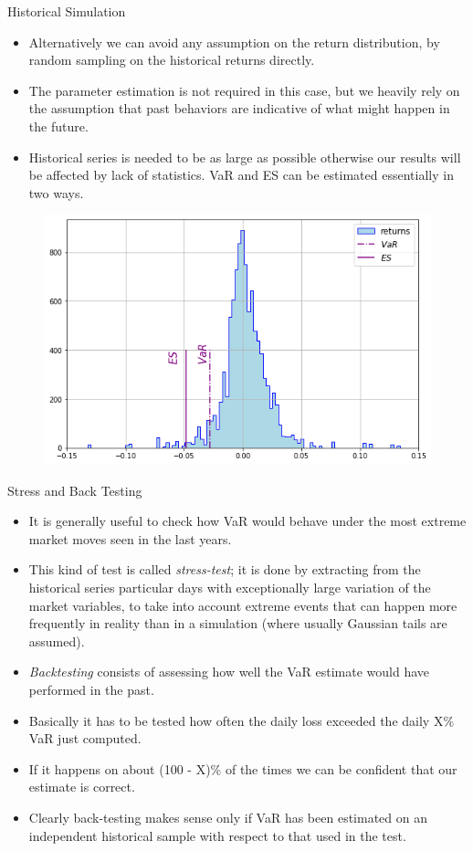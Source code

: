 \documentclass{beamer}
\begin{document}
\begin{frame}{Historical Simulation}
  \begin{itemize}
  \item Alternatively we can avoid any assumption on the return distribution, by random sampling on the historical returns directly. 
  \item The parameter estimation is not required in this case, but we heavily rely on the assumption that past behaviors are indicative of what might happen in the future. 
  \item Historical series is needed to be as large as possible otherwise our results will be affected by lack of statistics. 
    VaR and ES can be estimated essentially in two ways.
  \end{itemize}
  \begin{figure}[h]
    \begin{center}
      \includegraphics[width=0.4\linewidth]{historical_var}
    \end{center}
  \end{figure}
\end{frame}

\begin{frame}{Stress and Back Testing}
  \begin{itemize}
  \item It is generally useful to check how VaR would behave under the most extreme market moves seen in the last years.
  \item This kind of test is called \emph{stress-test}; it is done by extracting from the historical series particular days with exceptionally large variation of the market variables, to take into account extreme events that can happen more frequently in reality than in a simulation (where usually Gaussian tails are assumed). 
  \item \emph{Backtesting} consists of assessing how well the VaR estimate would have performed in the past. 
  \item Basically it has to be tested how often the daily loss exceeded the daily X\% VaR just computed. 
  \item If it happens on about (100 - X)\% of the times we can be confident that our estimate is correct. 
  \item Clearly back-testing makes sense only if VaR has been estimated on an independent historical sample with respect to that used in the test.
  \end{itemize}
\end{frame}
\end{document}
